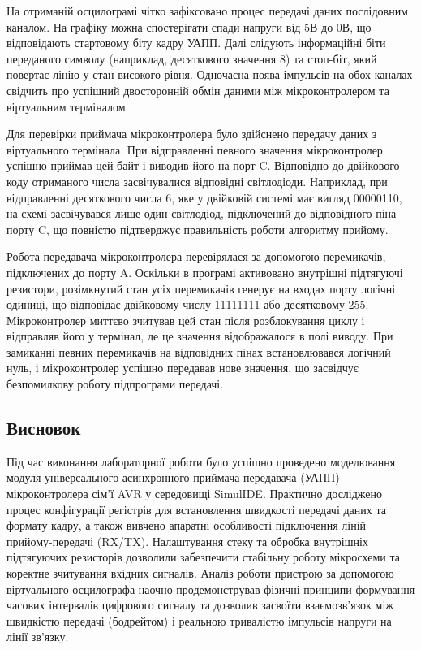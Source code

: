 \documentclass[14pt, a4paper]{extreport}
\begin{document}
	
	На отриманій осцилограмі чітко зафіксовано процес передачі даних послідовним каналом. На графіку можна спостерігати спади напруги від 5В до 0В, що відповідають стартовому біту кадру УАПП. Далі слідують інформаційні біти переданого символу (наприклад, десяткового значення 8) та стоп-біт, який повертає лінію у стан високого рівня. Одночасна поява імпульсів на обох каналах свідчить про успішний двосторонній обмін даними між мікроконтролером та віртуальним терміналом.
	
	Для перевірки приймача мікроконтролера було здійснено передачу даних з віртуального термінала. При відправленні певного значення мікроконтролер успішно приймав цей байт і виводив його на порт C. Відповідно до двійкового коду отриманого числа засвічувалися відповідні світлодіоди. Наприклад, при відправленні десяткового числа 6, яке у двійковій системі має вигляд 00000110, на схемі засвічувався лише один світлодіод, підключений до відповідного піна порту C, що повністю підтверджує правильність роботи алгоритму прийому.
	
	
	Робота передавача мікроконтролера перевірялася за допомогою перемикачів, підключених до порту A. Оскільки в програмі активовано внутрішні підтягуючі резистори, розімкнутий стан усіх перемикачів генерує на входах порту логічні одиниці, що відповідає двійковому числу 11111111 або десятковому 255. Мікроконтролер миттєво зчитував цей стан після розблокування циклу і відправляв його у термінал, де це значення відображалося в полі виводу. При замиканні певних перемикачів на відповідних пінах встановлювався логічний нуль, і мікроконтролер успішно передавав нове значення, що засвідчує безпомилкову роботу підпрограми передачі.
	
	
	\subsection*{Висновок}
	
	Під час виконання лабораторної роботи було успішно проведено моделювання модуля універсального асинхронного приймача-передавача (УАПП) мікроконтролера сім'ї AVR у середовищі SimulIDE. Практично досліджено процес конфігурації регістрів для встановлення швидкості передачі даних та формату кадру, а також вивчено апаратні особливості підключення ліній прийому-передачі (RX/TX). Налаштування стеку та обробка внутрішніх підтягуючих резисторів дозволили забезпечити стабільну роботу мікросхеми та коректне зчитування вхідних сигналів. Аналіз роботи пристрою за допомогою віртуального осцилографа наочно продемонстрував фізичні принципи формування часових інтервалів цифрового сигналу та дозволив засвоїти взаємозв'язок між швидкістю передачі (бодрейтом) і реальною тривалістю імпульсів напруги на лінії зв'язку.
	
\end{document}
